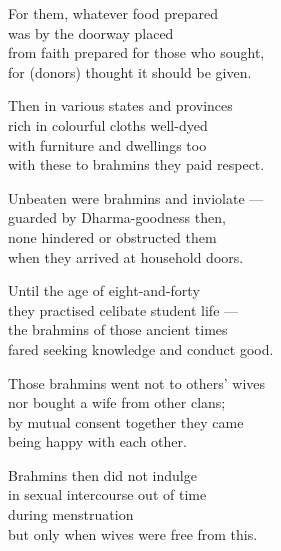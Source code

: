 \begin{MyDescription}{}
For them, whatever food prepared\\
was by the doorway placed\\
from faith prepared for those who sought,\\
for (donors) thought it should be given.
\end{MyDescription}  

\begin{MyDescription}{}
Then in various states and provinces\\
rich in colourful cloths well-dyed\\
with furniture and dwellings too\\
with these to brahmins they paid respect.
\end{MyDescription}  
   
\begin{MyDescription}{}
Unbeaten were brahmins and inviolate —\\
guarded by Dharma-goodness then,\\
none hindered or obstructed them\\
when they arrived at household doors.
\end{MyDescription}

\begin{MyDescription}{}
Until the age of eight-and-forty\\
they practised celibate student life —\\
the brahmins of those ancient times\\
fared seeking knowledge and conduct good.
\end{MyDescription}

\begin{MyDescription}{}
Those brahmins went not to others' wives\\
nor bought a wife from other clans;\\
by mutual consent together they came\\
being happy with each other.
\end{MyDescription}  
 
\begin{MyDescription}{}
Brahmins then did not indulge\\
in sexual intercourse out of time\\
during menstruation\\
but only when wives were free from this.
\end{MyDescription}  

